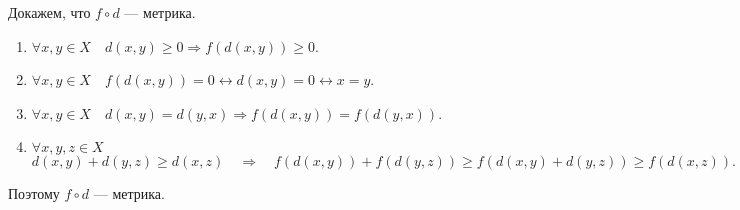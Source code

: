 \documentclass[12pt,a4paper]{article}
\begin{document}
\begin{problem}{9}
        Докажем, что $f \circ d$ --- метрика.
        \begin{enumerate}
            \item $\forall x, y \in X\quad d(x, y) \geqslant 0 \Rightarrow f(d(x, y)) \geqslant 0$.
            \item $\forall x, y \in X\quad f(d(x, y)) = 0 \leftrightarrow d(x, y) = 0 \leftrightarrow x = y$.
            \item $\forall x, y \in X\quad d(x, y) = d(y, x) \Rightarrow f(d(x, y)) = f(d(y, x))$.
            \item $\forall x, y, z \in X$
                \[d(x, y) + d(y, z) \geqslant d(x, z)\quad \Longrightarrow\quad f(d(x, y)) + f(d(y, z)) \geqslant f(d(x, y) + d(y, z)) \geqslant f(d(x, z)).\]
        \end{enumerate}
        Поэтому $f \circ d$ --- метрика.
    \end{problem}
\end{document}
